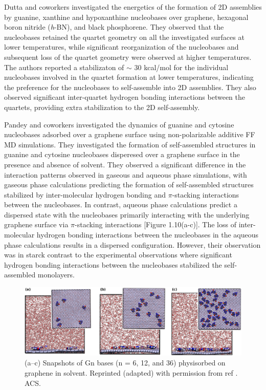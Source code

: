 Dutta and coworkers investigated the energetics of the formation of 2D assemblies by guanine, xanthine and hypoxanthine nucleobases over graphene, hexagonal boron nitride (\textit{h}-BN), and black phosphorene. They observed that the nucleobases retained the quartet geometry on all the investigated surfaces at lower temperatures, while significant reorganization of the nucleobases and subsequent loss of the quartet geometry were observed at higher temperatures.\supercite{mukhopadhyay_design_2018}  The authors reported a stabilizaton of $\sim$ 30 kcal/mol for the individual nucleobases involved in the quartet formation at lower temperatures, indicating the preference for the nucleobases to self-assemble into 2D assemblies. They also observed significant inter-quartet hydrogen bonding interactions between the quartets, providing extra stabilization to the 2D self-assembly.

Pandey and coworkers investigated the dynamics of guanine and cytosine nucleobases adsorbed over a graphene surface using non-polarizable additive FF MD simulations.\supercite{saikia_hierarchical_2017, saikia_dynamics_2018} They investigated the formation of self-assembled structures in guanine and cytosine nucleobases disperesed over a graphene surface in the presence and absence of solvent. They observed a significant difference in the interaction patterns observed in gaseous and aqueous phase simulations, with gaseous phase calculations predicting the formation of self-assembled structures stabilized by inter-molecular hydrogen bonding and $\pi$-stacking interactions between the nucleobases. In contrast, aqueous phase calculations predict a dispersed state with the nucleobases primarily interacting with the underlying graphene surface via $\pi$-stacking interactions [Figure 1.10(a-c)]. The loss of inter-molecular hydrogen bonding interactions between the nucleobases in the aqueous phase calculations results in a dispersed configuration. However, their observation was in starck contrast to the experimental observations\supercite{mu_temperature-dependent_2013, ciesielski_self-assembly_2013, heckl_two-dimensional_1991, freund_structure_1997} where significant hydrogen bonding interactions between the nucleobases stabilized the self-assembled monolayers.

\begin{figure}[h]
    \centering
    \includegraphics{Introduction/Figures/Figure7_cropped.png}
     \caption[Representaive image depicting guanine and cytosine self-assemblies over graphene]{(a–c) Snapshots of Gn bases (n = 6, 12, and 36) physisorbed on graphene in solvent.  Reprinted (adapted) with permission from ref \supercite{saikia_hierarchical_2017}. ACS.}
     \label{fig:figure10}
\end{figure}


